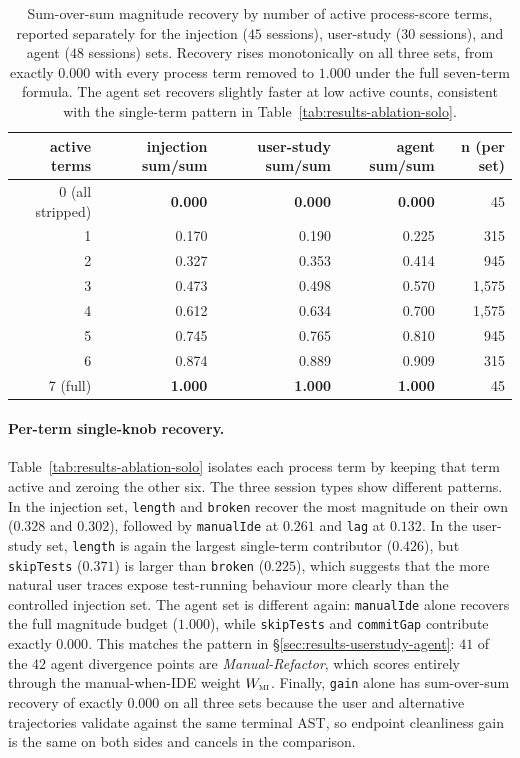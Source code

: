 \begin{table}[htbp]
\centering
\small
\begin{tabular}{rrrrr}
\hline
\textbf{active terms} & \textbf{injection sum/sum} & \textbf{user-study sum/sum} & \textbf{agent sum/sum} & \textbf{n (per set)} \\
\hline
0 (all stripped) & \textbf{0.000} & \textbf{0.000} & \textbf{0.000} & 45    \\
1                & 0.170 & 0.190 & 0.225 & 315   \\
2                & 0.327 & 0.353 & 0.414 & 945   \\
3                & 0.473 & 0.498 & 0.570 & 1{,}575 \\
4                & 0.612 & 0.634 & 0.700 & 1{,}575 \\
5                & 0.745 & 0.765 & 0.810 & 945   \\
6                & 0.874 & 0.889 & 0.909 & 315   \\
7 (full)         & \textbf{1.000} & \textbf{1.000} & \textbf{1.000} & 45    \\
\hline
\end{tabular}
\caption{Sum-over-sum magnitude recovery by number of active process-score terms, reported separately for the injection ($45$ sessions), user-study ($30$ sessions), and agent ($48$ sessions) sets. Recovery rises monotonically on all three sets, from exactly $0.000$ with every process term removed to $1.000$ under the full seven-term formula. The agent set recovers slightly faster at low active counts, consistent with the single-term pattern in Table~\ref{tab:results-ablation-solo}.}
\label{tab:results-ablation-monotone}
\end{table}

\paragraph{Per-term single-knob recovery.}
Table~\ref{tab:results-ablation-solo} isolates each process term by keeping that term active and zeroing the other six. The three session types show different patterns. In the injection set, \texttt{length} and \texttt{broken} recover the most magnitude on their own ($0.328$ and $0.302$), followed by \texttt{manualIde} at $0.261$ and \texttt{lag} at $0.132$. In the user-study set, \texttt{length} is again the largest single-term contributor ($0.426$), but \texttt{skipTests} ($0.371$) is larger than \texttt{broken} ($0.225$), which suggests that the more natural user traces expose test-running behaviour more clearly than the controlled injection set. The agent set is different again: \texttt{manualIde} alone recovers the full magnitude budget ($1.000$), while \texttt{skipTests} and \texttt{commitGap} contribute exactly $0.000$. This matches the pattern in \S\ref{sec:results-userstudy-agent}: $41$ of the $42$ agent divergence points are \emph{Manual-Refactor}, which scores entirely through the manual-when-IDE weight $W_{\textsc{mi}}$. Finally, \texttt{gain} alone has sum-over-sum recovery of exactly $0.000$ on all three sets because the user and alternative trajectories validate against the same terminal AST, so endpoint cleanliness gain is the same on both sides and cancels in the comparison.

